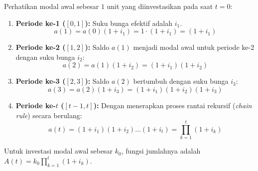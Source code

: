 \documentclass[11pt,a4paper]{article}
\begin{document}
\begin{notebox}
Perhatikan modal awal sebesar $1$ unit yang diinvestasikan pada saat $t = 0$:
\begin{center}
\end{center}
\begin{enumerate}[leftmargin=1.5em]
    \item \textbf{Periode ke-1 ($[0,1]$):} Suku bunga efektif adalah $i_1$.
    \begin{equation*}
        a(1) = a(0)(1 + i_1) = 1 \cdot (1 + i_1) = (1 + i_1)
    \end{equation*}
    \item \textbf{Periode ke-2 ($[1,2]$):} Saldo $a(1)$ menjadi modal awal untuk periode ke-2 dengan suku bunga $i_2$:
    \begin{equation*}
        a(2) = a(1)(1 + i_2) = (1 + i_1)(1 + i_2)
    \end{equation*}
    \item \textbf{Periode ke-3 ($[2,3]$):} Saldo $a(2)$ bertumbuh dengan suku bunga $i_3$:
    \begin{equation*}
        a(3) = a(2)(1 + i_3) = (1 + i_1)(1 + i_2)(1 + i_3)
    \end{equation*}
    \item \textbf{Periode ke-$t$ ($[t-1, t]$):} Dengan menerapkan proses rantai rekursif (\textit{chain rule}) secara berulang:
    \begin{equation}
        a(t) = (1 + i_1)(1 + i_2)\dots(1 + i_t) = \prod_{k=1}^t (1 + i_k)
    \end{equation}
\end{enumerate}
Untuk investasi modal awal sebesar $k_0$, fungsi jumlahnya adalah $A(t) = k_0 \prod_{k=1}^t (1 + i_k)$.
\end{notebox}
\end{document}
